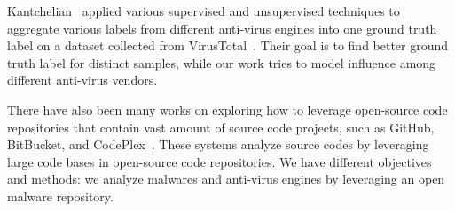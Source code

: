 Kantchelian \etal\ applied various supervised and unsupervised 
techniques to aggregate various labels from different anti-virus engines into one ground truth label 
on a dataset collected from VirusTotal~\cite{betterGT}. 
Their goal is to find better ground truth label for distinct samples, 
while our work tries to model influence among different anti-virus vendors.  

There have also been many works on exploring how to leverage open-source code repositories that contain vast amount of source code projects, 
such as GitHub, BitBucket, and CodePlex~\cite{code-completion,big-predicting,big-translation}. 
These systems analyze source codes by leveraging large code bases in open-source code repositories.
We have different objectives and methods: 
we analyze malwares and anti-virus engines by leveraging an open malware repository.


